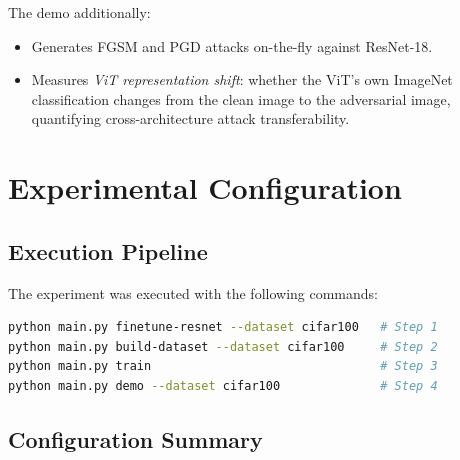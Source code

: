 \documentclass[12pt, a4paper]{article}
\begin{document}
The demo additionally:
\begin{itemize}[nosep]
    \item Generates FGSM and PGD attacks on-the-fly against ResNet-18.
    \item Measures \emph{ViT representation shift}: whether the ViT's own
          ImageNet classification changes from the clean image to the
          adversarial image, quantifying cross-architecture attack
          transferability.
\end{itemize}

\section{Experimental Configuration}

\subsection{Execution Pipeline}

The experiment was executed with the following commands:

\begin{lstlisting}[language=bash, caption={Execution commands for the CIFAR-100 experiment.}]
python main.py finetune-resnet --dataset cifar100   # Step 1
python main.py build-dataset --dataset cifar100     # Step 2
python main.py train                                # Step 3
python main.py demo --dataset cifar100              # Step 4
\end{lstlisting}

\subsection{Configuration Summary}
\end{document}
